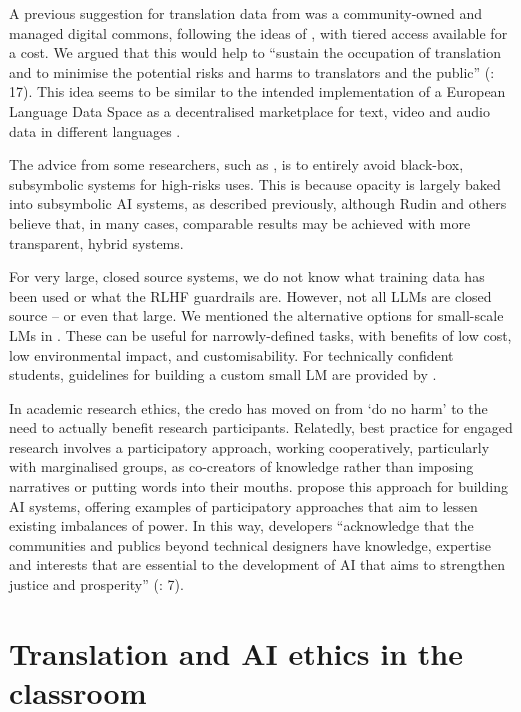 \documentclass[output=paper]{langscibook}
\begin{document}
A previous suggestion for translation data from \citet{moorkenslewis2019} was a community-owned and managed digital commons, following the ideas of \citet{ostrom2011}, with tiered access available for a cost. We argued that this would help to “sustain the occupation of translation and to minimise the potential risks and harms to translators and the public” (\citealt{moorkenslewis2019}: 17). This idea seems to be similar to the intended implementation of a European Language Data Space as a decentralised marketplace for text, video and audio data in different languages \citep{rehm_common_2024}.

The advice from some researchers, such as \citet{rudin2019stopexplainingblackbox}, is to entirely avoid black-box, subsymbolic systems for high-risks uses. This is because opacity is largely baked into subsymbolic AI systems, as described previously, although Rudin and others believe that, in many cases, comparable results may be achieved with more transparent, hybrid systems. 

For very large, closed source systems, we do not know what training data has been used or what the RLHF guardrails are. However, not all LLMs are closed source – or even that large. We mentioned the alternative options for small-scale LMs in . These can be useful for narrowly-defined tasks, with benefits of low cost, low environmental impact, and customisability. For technically confident students, guidelines for building a custom small LM are provided by \citet{moorkens_automating_2025}.

In academic research ethics, the credo has moved on from ‘do no harm’ to the need to actually benefit research participants. Relatedly, best practice for engaged research involves a participatory approach, working cooperatively, particularly with marginalised groups, as co-creators of knowledge rather than imposing narratives or putting words into their mouths. \citet{birhane_power_2022} propose this approach for building AI systems, offering examples of participatory approaches that aim to lessen existing imbalances of power. In this way, developers “acknowledge that the communities and publics beyond technical designers have knowledge, expertise and interests that are essential to the development of AI that aims to strengthen justice and prosperity” (\citealt{birhane_power_2022}: 7).

\section{Translation and AI ethics in the classroom}\label{sec:6:5}
\end{document}
